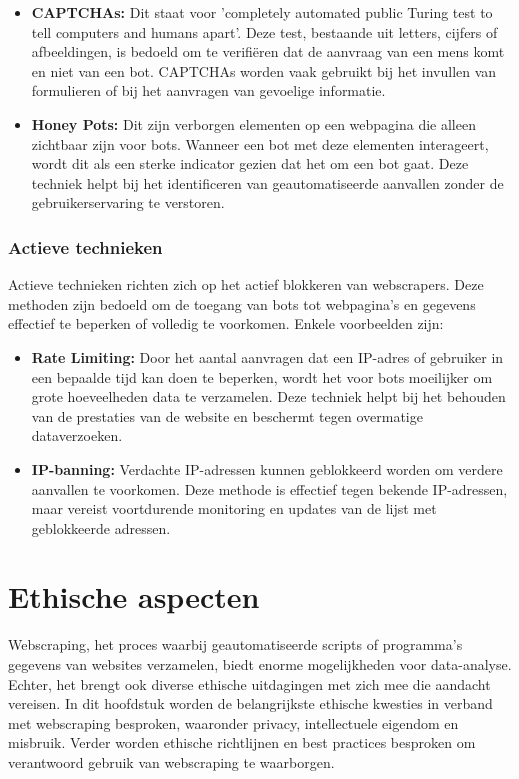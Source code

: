 \begin{itemize}
    \item \textbf{CAPTCHAs: } Dit staat voor 'completely automated public Turing test to tell computers and humans apart'. Deze  test, bestaande uit letters, cijfers of afbeeldingen, is bedoeld om te verifiëren dat de aanvraag van een mens komt en niet van een bot. CAPTCHAs worden vaak gebruikt bij het invullen van formulieren of bij het aanvragen van gevoelige informatie.

    \item \textbf{Honey Pots:} Dit zijn verborgen elementen op een webpagina die alleen zichtbaar zijn voor bots. Wanneer een bot met deze elementen interageert, wordt dit als een sterke indicator gezien dat het om een bot gaat. Deze techniek helpt bij het identificeren van geautomatiseerde aanvallen zonder de gebruikerservaring te verstoren.
\end{itemize}

\subsubsection{Actieve technieken}
Actieve technieken richten zich op het actief blokkeren van webscrapers. Deze methoden zijn bedoeld om de toegang van bots tot webpagina's en gegevens effectief te beperken of volledig te voorkomen. Enkele voorbeelden zijn:

\begin{itemize}
    \item \textbf{Rate Limiting:} Door het aantal aanvragen dat een IP-adres of gebruiker in een bepaalde tijd kan doen te beperken, wordt het voor bots moeilijker om grote hoeveelheden data te verzamelen. Deze techniek helpt bij het behouden van de prestaties van de website en beschermt tegen overmatige dataverzoeken.
    \item \textbf{IP-banning:} Verdachte IP-adressen kunnen geblokkeerd worden om verdere aanvallen te voorkomen. Deze methode is effectief tegen bekende IP-adressen, maar vereist voortdurende monitoring en updates van de lijst met geblokkeerde adressen.
\end{itemize}

\section{Ethische aspecten}
Webscraping, het proces waarbij geautomatiseerde scripts of programma's gegevens van websites verzamelen, biedt enorme mogelijkheden voor data-analyse. Echter, het brengt ook diverse ethische uitdagingen met zich mee die aandacht vereisen. In dit hoofdstuk worden de belangrijkste ethische kwesties in verband met webscraping besproken, waaronder privacy, intellectuele eigendom en misbruik. Verder worden ethische richtlijnen en best practices besproken om verantwoord gebruik van webscraping te waarborgen.

